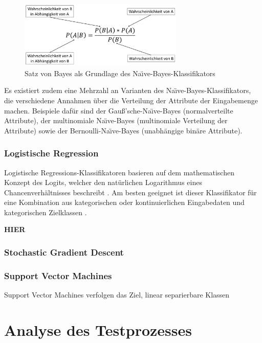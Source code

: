 \begin{figure}[]
    \centering
    \includegraphics[width=0.7\textwidth]{images/NB}
    \caption{Satz von Bayes als Grundlage des Na\"{\i}ve-Bayes-Klassifikators\label{fig:nb}}
\end{figure}

Es existiert zudem eine Mehrzahl an Varianten des Na\"{\i}ve-Bayes-Klassifikators, die verschiedene Annahmen über die Verteilung der Attribute der Eingabemenge machen. Beispiele dafür sind der Gauß'sche-Na\"{\i}ve-Bayes (normalverteilte Attribute), der multinomiale Na\"{\i}ve-Bayes (multinomiale Verteilung der Attribute) sowie der Bernoulli-Na\"{\i}ve-Bayes (unabhängige binäre Attribute).

\subsubsection*{Logistische Regression}
Logistische Regressions-Klassifikatoren basieren auf dem mathematischen Konzept des Logits, welcher den natürlichen Logarithmus eines Chancenverhältnisses beschreibt \cite{Peng2002}. Am besten geeignet ist dieser Klassifikator für eine Kombination aus kategorischen oder kontinuierlichen Eingabedaten und kategorischen Zielklassen \cite{Peng2002}.

\textbf{HIER}

\subsubsection*{Stochastic Gradient Descent}
\cite{Bottou2010}

\subsubsection*{Support Vector Machines}
Support Vector Machines verfolgen das Ziel, linear separierbare Klassen 
\cite{Tzotsos2006}

\section{Analyse des Testprozesses}

\cleardoublepage